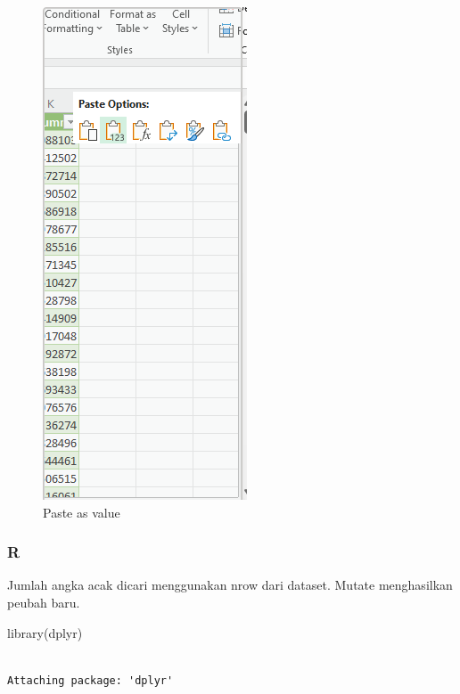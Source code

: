 \documentclass[
  letterpaper,
  DIV=11,
  numbers=noendperiod]{scrreprt}
\newenvironment{Shaded}{\begin{snugshade}}{\end{snugshade}}
\newcommand{\FunctionTok}[1]{\textcolor[rgb]{0.28,0.35,0.67}{#1}}
\newcommand{\NormalTok}[1]{\textcolor[rgb]{0.00,0.23,0.31}{#1}}
\begin{document}
\begin{figure}

{\centering \includegraphics{./step1-paste2.png}

}

\caption{Paste as value}

\end{figure}

\hypertarget{r-2}{%
\subsubsection{R}\label{r-2}}

Jumlah angka acak dicari menggunakan nrow dari dataset. Mutate
menghasilkan peubah baru.

\begin{Shaded}
\begin{Highlighting}[]
\FunctionTok{library}\NormalTok{(dplyr)}
\end{Highlighting}
\end{Shaded}

\begin{verbatim}

Attaching package: 'dplyr'
\end{verbatim}
\end{document}
